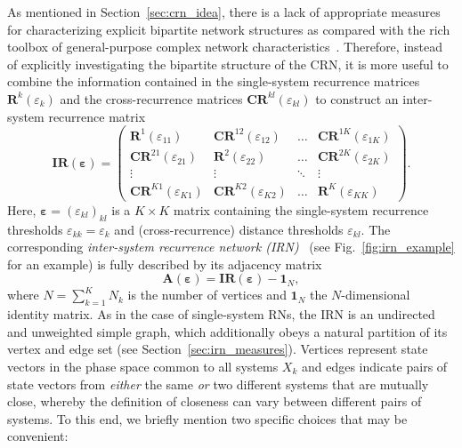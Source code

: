 As mentioned in Section~\ref{sec:crn_idea}, there is a lack of appropriate measures for characterizing explicit bipartite network structures as compared with the rich toolbox of general-purpose complex network characteristics~\cite{Boccaletti2006,Costa2007}. Therefore, instead of explicitly investigating the bipartite structure of the CRN, it is more useful to combine the information contained in the single-system recurrence matrices $\mathbf{R}^k(\varepsilon_k)$ and the cross-recurrence matrices $\mathbf{CR}^{kl}(\varepsilon_{kl})$ to construct an inter-system recurrence matrix~\cite{Feldhoff2012}
\begin{equation}
\mathbf{IR}(\mathbf{\varepsilon})=\left( \begin{array}{cccc} \mathbf{R}^1(\varepsilon_{11}) & \mathbf{CR}^{12}(\varepsilon_{12}) & \hdots & \mathbf{CR}^{1K}(\varepsilon_{1K}) \\
\mathbf{CR}^{21}(\varepsilon_{21}) & \mathbf{R}^2(\varepsilon_{22}) & \hdots & \mathbf{CR}^{2K}(\varepsilon_{2K}) \\
\vdots & \vdots & \ddots & \vdots \\ \mathbf{CR}^{K1}(\varepsilon_{K1}) & \mathbf{CR}^{K2}(\varepsilon_{K2}) & \hdots & \mathbf{R}^K(\varepsilon_{KK}) \end{array} \right).
\label{isrm}
\end{equation}
Here, $\mathbf{\varepsilon}=(\varepsilon_{kl})_{kl}$ is a $K \times K$ matrix containing the single-system recurrence thresholds $\varepsilon_{kk}=\varepsilon_k$ and (cross-recurrence) distance thresholds $\varepsilon_{kl}$. The corresponding \emph{inter-system recurrence network (IRN)}~\cite{Feldhoff2012} (see Fig.~\ref{fig:irn_example} for an example) is fully described by its adjacency matrix
\begin{equation}
\mathbf{A}(\mathbf{\varepsilon})=\mathbf{IR}(\mathbf{\varepsilon}) - \mathbf{1}_N,
\end{equation}
where $N=\sum_{k=1}^K N_k$ is the number of vertices and $\mathbf{1}_N$ the $N$-dimensional identity matrix. As in the case of single-system RNs, the IRN is an undirected and unweighted simple graph, which additionally obeys a natural partition of its vertex and edge set (see Section~\ref{sec:irn_measures}). Vertices represent state vectors in the phase space common to all systems $X_k$ and edges indicate pairs of state vectors from \emph{either} the same \emph{or} two different systems that are mutually close, whereby the definition of closeness can vary between different pairs of systems. To this end, we briefly mention two specific choices that may be convenient:

